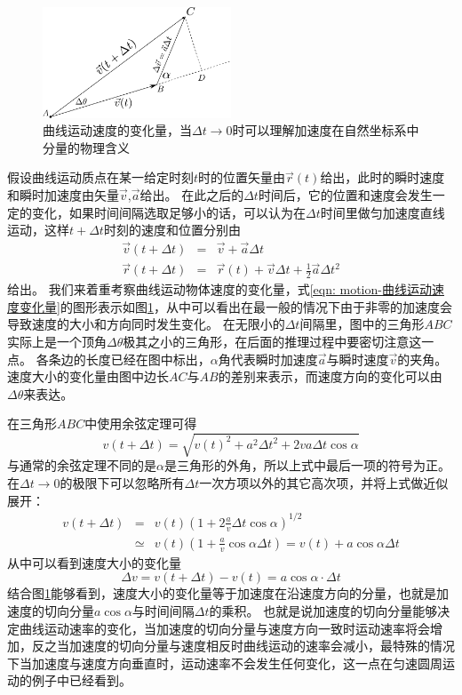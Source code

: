 \begin{figure}[hbtp]
\centering
\includegraphics[width = 0.5\textwidth]{images/motion-20.pdf}
\caption{曲线运动速度的变化量，当$\Delta t\rightarrow 0$时可以理解加速度在自然坐标系中分量的物理含义}
\label{fig: motion-曲线运动速度的变化}
\end{figure}

假设曲线运动质点在某一给定时刻$t$时的位置矢量由$\vec{r}(t)$给出，此时的瞬时速度和瞬时加速度由矢量$\vec{v}$,$\vec{a}$给出。
在此之后的$\Delta t$时间后，它的位置和速度会发生一定的变化，如果时间间隔选取足够小的话，可以认为在$\Delta t$时间里做匀加速度直线运动，这样$t+\Delta t$时刻的速度和位置分别由
\begin{eqnarray}
\vec{v}(t+\Delta t)& = &\vec{v}+\vec{a}\Delta t\label{eqn: motion-曲线运动速度变化量}\\
\vec{r}(t+\Delta t)& =& \vec{r}(t)+\vec{v}\Delta t+\frac{1}{2}\vec{a}\Delta t^2\label{eqn: motion-曲线运动中位置的变化量}
\end{eqnarray}
给出。
我们来着重考察曲线运动物体速度的变化量，式\ref{eqn: motion-曲线运动速度变化量}的图形表示如图\ref{fig: motion-曲线运动速度的变化}，从中可以看出在最一般的情况下由于非零的加速度会导致速度的大小和方向同时发生变化。
在无限小的$\Delta t$间隔里，图中的三角形$ABC$实际上是一个顶角$\Delta \theta$极其之小的三角形，在后面的推理过程中要密切注意这一点。
各条边的长度已经在图中标出，$\alpha$角代表瞬时加速度$\vec{a}$与瞬时速度$\vec{v}$的夹角。
速度大小的变化量由图中边长$AC$与$AB$的差别来表示，而速度方向的变化可以由$\Delta \theta$来表达。


在三角形$ABC$中使用余弦定理可得
\[
v(t+\Delta t) = \sqrt{v(t)^2+a^2\Delta t^2+2va\Delta t\cos\alpha}
\]
与通常的余弦定理不同的是$\alpha$是三角形的外角，所以上式中最后一项的符号为正。
在$\Delta t\rightarrow 0$的极限下可以忽略所有$\Delta t$一次方项以外的其它高次项，并将上式做近似展开：
\begin{eqnarray*}
v(t+\Delta t)&=&v(t)\left(1+2\frac{a}{v}\Delta t\cos\alpha\right)^{1/2}\\
& \simeq & v(t)\left( 1+ \frac{a}{v}\cos\alpha\Delta t \right) = v(t)+a\cos\alpha \Delta t
\end{eqnarray*}
从中可以看到速度大小的变化量
\[
\Delta v = v(t+\Delta t)-v(t) = a\cos\alpha\cdot \Delta t
\]
结合图\ref{fig: motion-曲线运动速度的变化}能够看到，速度大小的变化量等于加速度在沿速度方向的分量，也就是加速度的切向分量$a\cos\alpha$与时间间隔$\Delta t$的乘积。
也就是说加速度的切向分量能够决定曲线运动速率的变化，当加速度的切向分量与速度方向一致时运动速率将会增加，反之当加速度的切向分量与速度相反时曲线运动的速率会减小，最特殊的情况下当加速度与速度方向垂直时，运动速率不会发生任何变化，这一点在匀速圆周运动的例子中已经看到。

